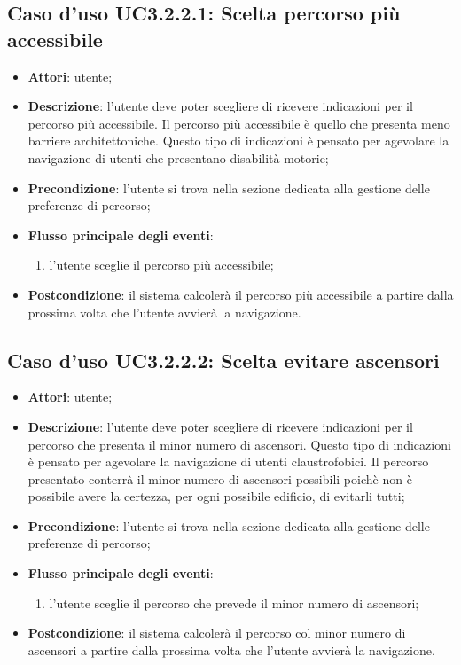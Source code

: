 \documentclass[../AnalisiDeiRequisiti.tex]{subfiles}
\begin{document}
\subsection{Caso d'uso UC3.2.2.1: Scelta percorso più accessibile}
\begin{itemize}
	\item \textbf{Attori}: utente;
	\item \textbf{Descrizione}: l'utente deve poter scegliere di ricevere indicazioni per il percorso più accessibile. Il percorso più accessibile è quello che presenta meno barriere architettoniche. Questo tipo di indicazioni è pensato per agevolare la navigazione di utenti che presentano disabilità motorie; 
	\item \textbf{Precondizione}: l'utente si trova nella sezione dedicata alla gestione delle preferenze di percorso;
	
	\item \textbf{Flusso principale degli eventi}:
	\begin{enumerate}
		\item l'utente sceglie il percorso più accessibile;
		
	\end{enumerate}
	\item \textbf{Postcondizione}: il sistema calcolerà il percorso più accessibile a partire dalla prossima volta che l'utente avvierà la navigazione.
\end{itemize}
\hypertarget{UC3.2.2.2}{}
\subsection{Caso d'uso UC3.2.2.2: Scelta evitare ascensori}
\begin{itemize}
	\item \textbf{Attori}: utente;
	\item \textbf{Descrizione}: l'utente deve poter scegliere di ricevere indicazioni per il percorso che presenta il minor numero di ascensori. Questo tipo di indicazioni è pensato per agevolare la navigazione di utenti claustrofobici. Il percorso presentato conterrà il minor numero di ascensori possibili poichè non è possibile avere la certezza, per ogni possibile edificio, di evitarli tutti; 
	\item \textbf{Precondizione}: l'utente si trova nella sezione dedicata alla gestione delle preferenze di percorso;
	
	\item \textbf{Flusso principale degli eventi}:
	\begin{enumerate}
		\item l'utente sceglie il percorso che prevede il minor numero di ascensori;
		
	\end{enumerate}
	\item \textbf{Postcondizione}: il sistema calcolerà il percorso col minor numero di ascensori a partire dalla prossima volta che l'utente avvierà la navigazione.
\end{itemize}
\hypertarget{UC3.2.2.3}{}
\end{document}

